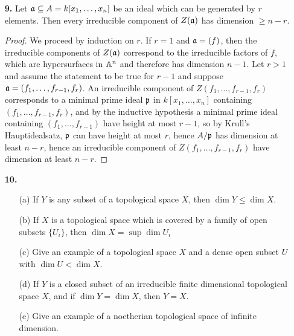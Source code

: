 \documentclass{article}
\begin{document}
\begin{enumerate} [label=\textbf{\arabic*.}, leftmargin=0em]
\item[\textbf{9.}] Let $\mathfrak{a} \subseteq A = k[x_1, \dots, x_n]$ be an ideal which can be generated by $r$ elements. Then every irreducible component of $Z(\mathfrak{a})$ has dimension $\geq n - r$.

\begin{proof}
    We proceed by induction on $r$. If $r = 1$ and $\mathfrak{a} = (f)$, then the irreducible components of $Z(\mathfrak{a})$ correspond to the irreducible factors of $f$, which are hypersurfaces in $\mathbb{A}^n$ and therefore has dimension $n - 1$. Let $r > 1$ and assume the statement to be true for $r - 1$ and suppose $\mathfrak{a} = (f_1, \dots, f_{r - 1}, f_r)$. An irreducible component of $Z(f_1, \dots, f_{r - 1}, f_r)$ corresponds to a minimal prime ideal $\mathfrak{p}$ in $k[x_1, \dots, x_n]$ containing $(f_1, \dots, f_{r - 1}, f_r)$, and by the inductive hypothesis a minimal prime ideal containing $(f_1, \dots, f_{r - 1})$ have height at most $r - 1$, so by Krull's Hauptidealsatz, $\mathfrak{p}$ can have height at most $r$, hence $A / \mathfrak{p}$ has dimension at least $n - r$, hence an irreducible component of $Z(f_1, \dots, f_{r - 1}, f_r)$ have dimension at least $n - r$.
\end{proof}

\item[\textbf{10.}]
\begin{itemize}
    \item[(a)] If $Y$ is any subset of a topological space $X$, then $\dim{Y} \leq \dim{X}$.

    \item[(b)] If $X$ is a topological space which is covered by a family of open subsets $\{ U_i \}$, then $\dim{X} = \sup{\dim{U_i}}$

    \item[(c)] Give an example of a topological space $X$ and a dense open subset $U$ with $\dim{U} < \dim{X}$.

    \item[(d)] If $Y$ is a closed subset of an irreducible finite dimensional topological space $X$, and if $\dim{Y} = \dim{X}$, then $Y = X$.

    \item[(e)] Give an example of a noetherian topological space of infinite dimension.
\end{itemize}


\end{enumerate}
\end{document}

